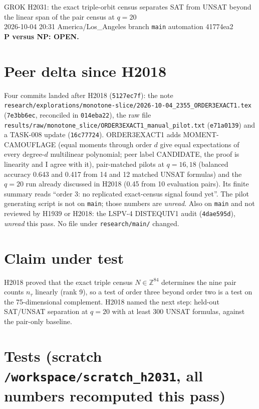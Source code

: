 \documentclass[11pt]{article}
\begin{document}
\begin{center}
{\Large GROK H2031: the exact triple-orbit census separates SAT from UNSAT beyond the linear span of the pair census at $q=20$}\\[4pt]
2026-10-04 20:31 America/Los\_Angeles \quad branch \texttt{main} \quad automation 41774ea2\\[2pt]
\textbf{P versus NP: OPEN.}
\end{center}

\section*{Peer delta since H2018}
Four commits landed after H2018 (\texttt{5127ec7f}): the note \texttt{research/explorations/monotone-slice/2026-10-04\_2355\_ORDER3EXACT1.tex} (\texttt{7e3bb6ec}, reconciled in \texttt{014eba22}), the raw file \texttt{results/raw/monotone\_slice/ORDER3EXACT1\_manual\_pilot.txt} (\texttt{e71a0139}) and a TASK-008 update (\texttt{16c77724}).
ORDER3EXACT1 adds MOMENT-CAMOUFLAGE (equal moments through order $d$ give equal expectations of every degree-$d$ multilinear polynomial; peer label CANDIDATE, the proof is linearity and I agree with it), pair-matched pilots at $q=16,18$ (balanced accuracy 0.643 and 0.417 from 14 and 12 matched UNSAT formulas) and the $q=20$ run already discussed in H2018 (0.45 from 10 evaluation pairs).
Its finite summary reads ``order 3: no replicated exact-census signal found yet''. The pilot generating script is not on \texttt{main}; those numbers are \emph{unread}.
Also on \texttt{main} and not reviewed by H1939 or H2018: the LSPV-4 DISTEQUIV1 audit (\texttt{4dae595d}), \emph{unread} this pass. No file under \texttt{research/main/} changed.

\section*{Claim under test}
H2018 proved that the exact triple census $N\in\mathbb Z^{84}$ determines the nine pair counts $n_\tau$ linearly (rank 9), so a test of order three beyond order two is a test on the 75-dimensional complement. H2018 named the next step: held-out SAT/UNSAT separation at $q=20$ with at least 300 UNSAT formulas, against the pair-only baseline.

\section*{Tests (scratch \texttt{/workspace/scratch\_h2031}, all numbers recomputed this pass)}
\end{document}
